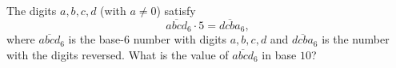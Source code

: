 The digits $a,b,c,d$ (with $a\ne0$) satisfy
\[\overline{abcd}_6\cdot5=\overline{dcba}_6,\]
where $\overline{abcd}_6$ is the base-$6$ number with digits $a,b,c,d$ and $\overline{dcba}_6$ is the number with the digits reversed. What is the value of $\overline{abcd}_6$ in base $10$?
